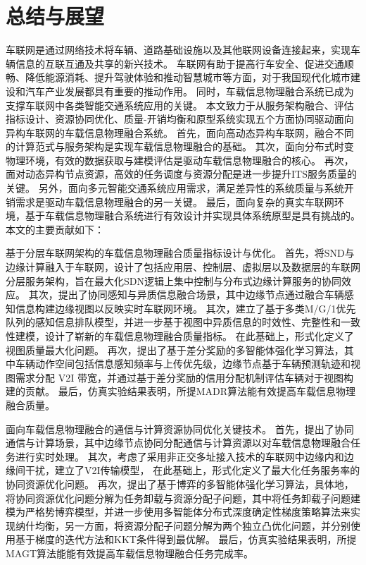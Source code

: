 \chapter{总结与展望}\label{section 7}

车联网是通过网络技术将车辆、道路基础设施以及其他联网设备连接起来，实现车辆信息的互联互通及共享的新兴技术。
车联网有助于提高行车安全、促进交通顺畅、降低能源消耗、提升驾驶体验和推动智慧城市等方面，对于我国现代化城市建设和汽车产业发展都具有重要的推动作用。
同时，车载信息物理融合系统已成为支撑车联网中各类智能交通系统应用的关键。
本文致力于从服务架构融合、评估指标设计、资源协同优化、质量-开销均衡和原型系统实现五个方面协同驱动面向异构车联网的车载信息物理融合系统。
首先，面向高动态异构车联网，融合不同的计算范式与服务架构是实现车载信息物理融合的基础。
其次，面向分布式时变物理环境，有效的数据获取与建模评估是驱动车载信息物理融合的核心。
再次，面对动态异构节点资源，高效的任务调度与资源分配是进一步提升ITS服务质量的关键。
另外，面向多元智能交通系统应用需求，满足差异性的系统质量与系统开销需求是驱动车载信息物理融合的另一关键。
最后，面向复杂的真实车联网环境，基于车载信息物理融合系统进行有效设计并实现具体系统原型是具有挑战的。
本文的主要贡献如下：

 基于分层车联网架构的车载信息物理融合质量指标设计与优化。
首先，将SND与边缘计算融入于车联网，设计了包括应用层、控制层、虚拟层以及数据层的车联网分层服务架构，旨在最大化SDN逻辑上集中控制与分布式边缘计算服务的协同效应。
其次，提出了协同感知与异质信息融合场景，其中边缘节点通过融合车辆感知信息构建边缘视图以反映实时车联网环境。
其次，建立了基于多类M/G/1优先队列的感知信息排队模型，并进一步基于视图中异质信息的时效性、完整性和一致性建模，设计了崭新的车载信息物理融合质量指标。
在此基础上，形式化定义了视图质量最大化问题。
再次，提出了基于差分奖励的多智能体强化学习算法，其中车辆动作空间包括信息感知频率与上传优先级，边缘节点基于车辆预测轨迹和视图需求分配 V2I 带宽，并通过基于差分奖励的信用分配机制评估车辆对于视图构建的贡献。
最后，仿真实验结果表明，所提MADR算法能有效提高车载信息物理融合质量。

 面向车载信息物理融合的通信与计算资源协同优化关键技术。
首先，提出了协同通信与计算场景，其中边缘节点协同分配通信与计算资源以对车载信息物理融合任务进行实时处理。
其次，考虑了采用非正交多址接入技术的车联网中边缘内和边缘间干扰，建立了V2I传输模型，
在此基础上，形式化定义了最大化任务服务率的协同资源优化问题。
再次，提出了基于博弈的多智能体强化学习算法，具体地，将协同资源优化问题分解为任务卸载与资源分配子问题，其中将任务卸载子问题建模为严格势博弈模型，并进一步使用多智能体分布式深度确定性梯度策略算法来实现纳什均衡，另一方面，将资源分配子问题分解为两个独立凸优化问题，并分别使用基于梯度的迭代方法和KKT条件得到最优解。
最后，仿真实验结果表明，所提MAGT算法能能有效提高车载信息物理融合任务完成率。

